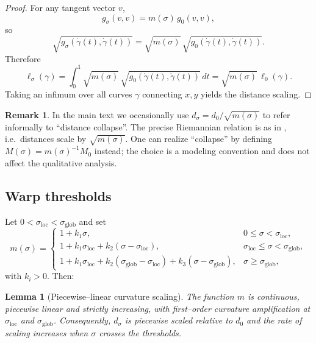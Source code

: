 \documentclass[11pt]{article}
\theoremstyle{plain}
\newtheorem{lemma}[theorem]{Lemma}
\theoremstyle{definition}
\newtheorem{remark}[theorem]{Remark}
\numberwithin{equation}{section}
\begin{document}
\begin{proof}
For any tangent vector $v$,
\[
g_\sigma(v,v) = m(\sigma)\,g_0(v,v),
\]
so
\[
\sqrt{g_\sigma(\dot{\gamma}(t),\dot{\gamma}(t))}
 = \sqrt{m(\sigma)}\,
    \sqrt{g_0(\dot{\gamma}(t),\dot{\gamma}(t))}.
\]
Therefore
\[
\ell_\sigma(\gamma)
 = \int_0^1 \sqrt{m(\sigma)}\,
              \sqrt{g_0(\dot{\gamma}(t),\dot{\gamma}(t))}\,dt
 = \sqrt{m(\sigma)}\,\ell_0(\gamma).
\]
Taking an infimum over all curves $\gamma$ connecting $x,y$ yields the
distance scaling.
\end{proof}

\begin{remark}
In the main text we occasionally use $d_\sigma = d_0 / \sqrt{m(\sigma)}$
to refer informally to ``distance collapse''. The precise Riemannian
relation is as in , i.e.\ distances scale
by $\sqrt{m(\sigma)}$. One can realize ``collapse'' by defining
$M(\sigma) = m(\sigma)^{-1} M_0$ instead; the choice is a modeling
convention and does not affect the qualitative analysis.
\end{remark}

\subsection{Warp thresholds}

Let $0 < \sigma_{\mathrm{loc}} < \sigma_{\mathrm{glob}}$ and set
\begin{equation}
  m(\sigma)
  =
  \begin{cases}
    1 + k_1 \sigma, & 0 \le \sigma < \sigma_{\mathrm{loc}},\\[0.2em]
    1 + k_1 \sigma_{\mathrm{loc}}
      + k_2(\sigma - \sigma_{\mathrm{loc}}),
      & \sigma_{\mathrm{loc}} \le \sigma < \sigma_{\mathrm{glob}},\\[0.2em]
    1 + k_1 \sigma_{\mathrm{loc}}
      + k_2(\sigma_{\mathrm{glob}} - \sigma_{\mathrm{loc}})
      + k_3(\sigma - \sigma_{\mathrm{glob}}),
      & \sigma \ge \sigma_{\mathrm{glob}},
  \end{cases}
\end{equation}
with $k_i > 0$. Then:

\begin{lemma}[Piecewise--linear curvature scaling]
\label{lem:piecewise-m}
The function $m$ is continuous, piecewise linear and strictly
increasing, with first--order curvature amplification at
$\sigma_{\mathrm{loc}}$ and $\sigma_{\mathrm{glob}}$. Consequently,
$d_\sigma$ is piecewise scaled relative to $d_0$ and the rate of
scaling increases when $\sigma$ crosses the thresholds.
\end{lemma}
\end{document}
